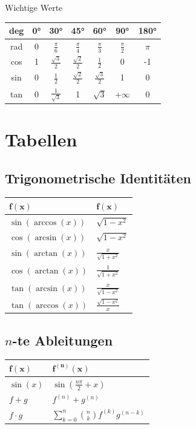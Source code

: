 \documentclass[a4paper,10pt]{article}
\begin{document}
\begin{mainbox}{Wichtige Werte}
  \begin{center} 
    \begin{tabular}{c|cccccc}
      deg & 0° & 30° & 45° & 60° & 90° & 180° \\
      \midrule
      rad & 0 & $\frac{\pi}{6}$ & $\frac{\pi}{4}$ & $\frac{\pi}{3}$ & $\frac{\pi}{2}$ & $\pi$ \\
      cos & 1 & $\frac{\sqrt{3}}{2}$ & $\frac{\sqrt{2}}{2}$ & $\frac{1}{2}$ & 0 & -1 \\
      sin & 0 & $\frac{1}{2}$ & $\frac{\sqrt{2}}{2}$ & $\frac{\sqrt{3}}{2}$ & 1 & 0 \\
      tan & 0 & $\frac{1}{\sqrt{3}}$ & 1 & $\sqrt{3}$ & $+\infty$ & 0 \\
    \end{tabular}
  \end{center}
\end{mainbox}

\section{Tabellen}


\subsection{Trigonometrische Identitäten}
\begin{center}
 \begin{tabularx}{\linewidth}{>{\centering\arraybackslash}X>{\centering\arraybackslash}X}
  \toprule
  $\mathbf{f(x)}$ & $\mathbf{f(x)}$ \\
  \midrule
  $\sin(\arccos (x))$ & $\sqrt{1-x^2}$\\
  $\cos(\arcsin(x))$ & $\sqrt{1-x^2}$\\
  $\sin(\arctan(x))$ & $\frac{x}{\sqrt{1+x^2}}$\\
  $\cos(\arctan(x))$ & $\frac{1}{\sqrt{1+x^2}}$\\
  $\tan(\arcsin(x))$ & $\frac{x}{\sqrt{1-x^2}}$\\
  $\tan(\arccos(x))$ & $\frac{\sqrt{1-x^2}}{x}$\\
  \bottomrule
 \end{tabularx}
\end{center}

\subsection{$n$-te Ableitungen}
\begin{center}
  \begin{tabularx}{\linewidth}{>{\centering\arraybackslash}X>{\centering\arraybackslash}X}
  \toprule
  $\mathbf{f(x)}$ & $\mathbf{f^{(n)}(x)}$ \\
  \midrule
  $\sin(x)$ & $\sin(\frac{n\pi}{2} + x)$\\
  $f + g$ & $f^{(n)} + g^{(n)}$\\
  $f \cdot g$ & $\sum\limits_{k=0}^{n}\binom{n}{k}f^{(k)}g^{(n-k)}$\\
  \bottomrule
  \end{tabularx}
\end{center}
\end{document}
